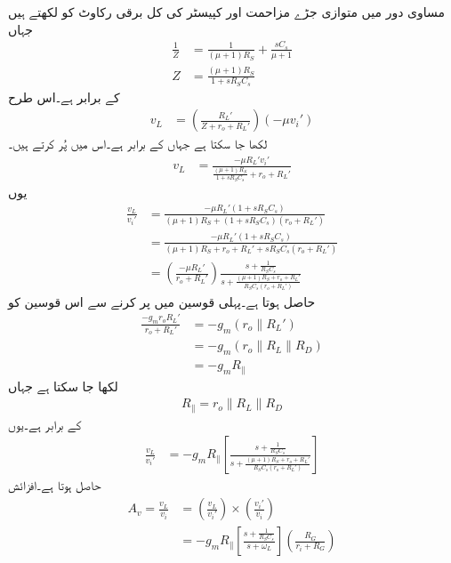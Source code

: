 مساوی دور میں متوازی جڑے مزاحمت اور کپیسٹر کی کل برقی رکاوٹ کو  لکھتے ہیں جہاں
\begin{align*}
\frac{1}{Z}&=\frac{1}{\left(\mu+1 \right)R_S}+\frac{s C_s}{\mu+1}\\
Z&=\frac{\left(\mu+1 \right)R_S}{1+s R_S C_s}
\end{align*}
کے برابر ہے۔اس طرح
\begin{align*}
v_L&=\left(\frac{R_L'}{Z +r_o +R_L'}\right) \left(-\mu v_i' \right)
\end{align*}
لکھا جا سکتا ہے جہاں  کے برابر ہے۔اس میں  پُر کرتے ہیں۔
\begin{align*}
v_L&=\frac{-\mu R_L' v_i'}{\frac{\left(\mu+1 \right)R_S}{1+s R_S C_s} +r_o +R_L'}
\end{align*}
یوں
\begin{align*}
\frac{v_L}{v_i'}&=\frac{-\mu R_L' \left(1+s R_S C_s \right)}{\left(\mu+1 \right)R_S +\left(1+s R_S C_s \right)\left(r_o +R_L'\right)}\\
&=\frac{-\mu R_L' \left(1+s R_S C_s \right)}{\left(\mu+1 \right)R_S +r_o +R_L'+s R_S C_s \left(r_o +R_L'\right)}\\
&=\left(\frac{-\mu R_L'}{r_o+R_L'}\right)\frac{s+\frac{1}{ R_S C_s}}{s+\frac{\left(\mu+1 \right)R_S +r_o +R_L'}{R_S C_s \left(r_o +R_L'\right)}}
\end{align*}
حاصل ہوتا ہے۔پہلی قوسین  میں  پر کرنے سے اس قوسین کو
\begin{align*}
\frac{-g_m r_o R_L'}{r_o+R_L'}&=-g_m \left(r_o\mathbin{\|} R_L' \right)\\
&=-g_m \left(r_o\mathbin{\|} R_L \mathbin{\|} R_D \right)\\
&= -g_m R_{\mathbin{\|}}
\end{align*}
لکھا جا سکتا ہے جہاں
\begin{align*}
R_{\mathbin{\|}}=r_o\mathbin{\|} R_L \mathbin{\|} R_D
\end{align*}
کے برابر ہے۔یوں
\begin{align*}
\frac{v_L}{v_i'}&=-g_m R_{\mathbin{\|}}\left[\frac{s+\frac{1}{ R_S C_s}}{s+\frac{\left(\mu+1 \right)R_S +r_o +R_L'}{R_S C_s \left(r_o +R_L'\right)}}\right]
\end{align*}
حاصل ہوتا ہے۔افزائش
\begin{align}\label{مساوات_تعدد_ردعمل_افزائش_ماسفیٹ_مخارج_کپیسٹر}
A_v =\frac{v_L}{v_i}&=\left(\frac{v_L}{v_i'}\right) \times \left(\frac{v_i'}{v_i}\right)\\
&=-g_m R_{\mathbin{\|}}\left[\frac{s+\frac{1}{ R_S C_s}}{s+\omega_L}\right] \left(\frac{R_G}{r_i+R_G} \right)
\end{align}
